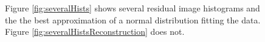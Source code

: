 \begin{figure}
	\centering
	
	
		\caption[Several residual image histograms.]{Figure \ref{fig:severalHists} shows several residual image histograms and the the best approximation of a normal distribution fitting the data.  Figure \ref{fig:severalHistsReconstruction} does not.}
\end{figure}



